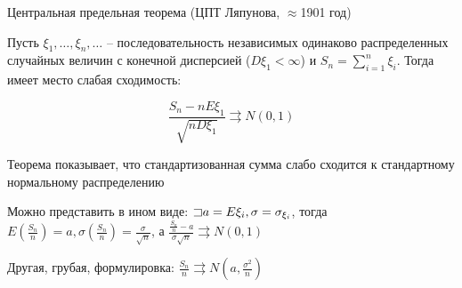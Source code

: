 \documentclass[12pt]{article}
\begin{document}
    \hypertarget{centrallimittheorem}{}

    \begin{MyTheorem}
        \Ths Центральная предельная теорема (ЦПТ Ляпунова, $\approx$1901 год)

        Пусть $\xi_1, \dots, \xi_n, \dots$ -- последовательность независимых одинаково распределенных случайных величин
        с конечной дисперсией ($D\xi_1 < \infty$) и $S_n = \sum_{i = 1}^n \xi_i$. Тогда имеет место слабая сходимость:

        \[\frac{S_n - nE\xi_1}{\sqrt{nD\xi_1}} \rightrightarrows N(0, 1)\]
    \end{MyTheorem}

    Теорема показывает, что стандартизованная сумма слабо сходится к стандартному нормальному распределению

    \Nota Можно представить в ином виде: $\mathord{\sqsupset} a = E\xi_i, \sigma = \sigma_{\xi_i}$, тогда $E\left(\frac{S_n}{n}\right) = a, \sigma\left(\frac{S_n}{n}\right) = \frac{\sigma}{\sqrt{n}}$, а $\frac{\frac{S_n}{n} - a}{\sigma \sqrt{n}} \rightrightarrows N(0, 1)$

    \Nota Другая, грубая, формулировка: $\frac{S_n}{n} \rightrightarrows N\left(a, \frac{\sigma^2}{n}\right)$
\end{document}
